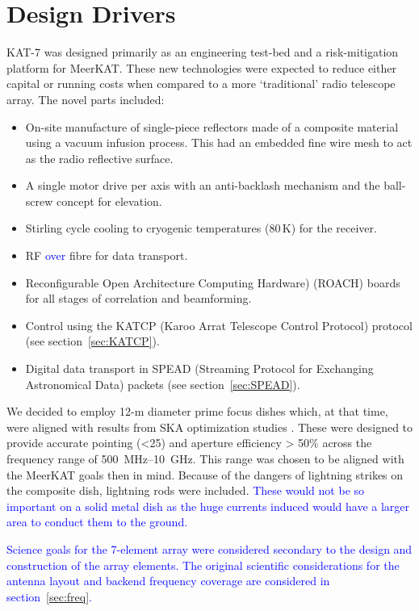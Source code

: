 \section{Design Drivers}
\label{sec:design}

\noindent
KAT-7 was designed primarily as an engineering test-bed and a
risk-mitigation platform for MeerKAT\@. These new technologies were
expected to reduce either capital or running costs when compared to a
more `traditional' radio telescope array. The novel parts included:


\begin{itemize}
\item On-site manufacture of single-piece reflectors made of a
  composite material using a vacuum infusion process. This had an
  embedded fine wire mesh to act as the radio reflective surface.
\item A single motor drive per axis with an anti-backlash mechanism
  and the ball-screw concept for elevation.
\item Stirling cycle cooling to cryogenic temperatures (80\,K) for the
  receiver.
\item RF \textcolor{blue}{over} fibre for data transport.
\item Reconfigurable Open Architecture Computing Hardware) (ROACH)
  boards for all stages of correlation and beamforming.
\item Control using the KATCP (Karoo Arrat Telescope Control Protocol)
 protocol (see section~\ref{sec:KATCP}).
\item Digital data transport in SPEAD (Streaming Protocol for
 Exchanging Astronomical Data) packets (see section~\ref{sec:SPEAD}).
\end{itemize}

We decided to employ 12-m diameter prime focus dishes which, at that time,
were aligned with results from SKA optimization studies
\citep{strawman}. These were designed to provide accurate
pointing (\textless 25\arcsec) and aperture efficiency \textgreater
50\% across the frequency range of 500~MHz--10~GHz. This range
was chosen to be aligned with the MeerKAT goals then in mind. Because
of the dangers of lightning strikes on the composite dish, lightning rods were
included. \textcolor{blue}{These would not be so important on a solid metal
dish as the huge currents induced would have a larger area to conduct them to the
ground.}

\textcolor{blue}{
Science goals for the 7-element array were considered secondary to the
design and construction of the array elements. The original scientific 
considerations for the antenna layout and backend frequency coverage are 
considered in section~\ref{sec:freq}.}
